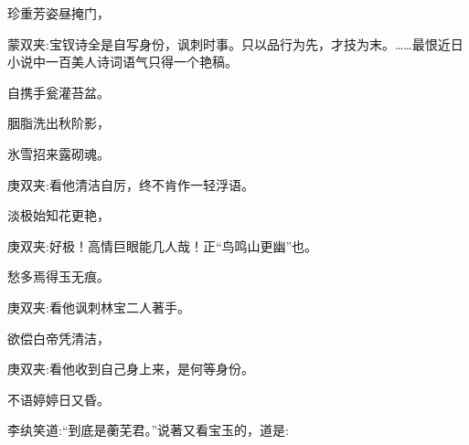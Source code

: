 \begin{poem}
    \begin{pl}珍重芳姿昼掩门，\end{pl}
    \begin{note}蒙双夹:宝钗诗全是自写身份，讽刺时事。只以品行为先，才技为末。……最恨近日小说中一百美人诗词语气只得一个艳稿。\end{note}

    \begin{pl}自携手瓮灌苔盆。\end{pl}

    \begin{pl}胭脂洗出秋阶影，\end{pl}

    \begin{pl}氷雪招来露砌魂。\end{pl}
    \begin{note}庚双夹:看他清洁自厉，终不肯作一轻浮语。\end{note}

    \begin{pl}淡极始知花更艳，\end{pl}
    \begin{note}庚双夹:好极！高情巨眼能几人哉！正“鸟鸣山更幽”也。\end{note}

    \begin{pl}愁多焉得玉无痕。\end{pl}
    \begin{note}庚双夹:看他讽刺林宝二人著手。\end{note}

    \begin{pl}欲偿白帝凭清洁，\end{pl}
    \begin{note}庚双夹:看他收到自己身上来，是何等身份。\end{note}

    \begin{pl}不语婷婷日又昏。\end{pl}
\end{poem}


\begin{parag}
    李纨笑道:“到底是蘅芜君。”说著又看宝玉的，道是:
\end{parag}


